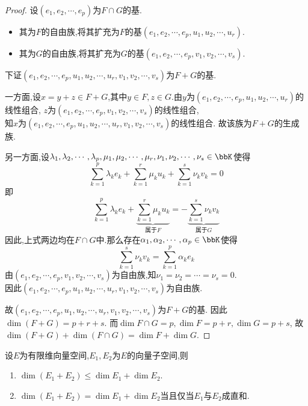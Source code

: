 \begin{proof}
    设$(e_1, e_2, \cdots, e_p)$为$F \cap G$的基.

    \begin{itemize}
        \item 其为$F$的自由族,将其扩充为$F$的基$(e_1, e_2, \cdots, e_p, u_1, u_2, \cdots, u_r)$.
        \item 其为$G$的自由族,将其扩充为$G$的基$(e_1, e_2, \cdots, e_p, v_1, v_2, \cdots, v_s)$.
    \end{itemize}

    下证$(e_1, e_2, \cdots, e_p, u_1, u_2, \cdots, u_r, v_1, v_2, \cdots, v_s)$为$F + G$的基.

    一方面,设$x = y + z \in F + G$,其中$y \in F, z \in G$.由$y$为$(e_1, e_2, \cdots, e_p, u_1, u_2, \cdots, u_r)$的线性组合,
    $z$为$(e_1, e_2, \cdots, e_p, v_1, v_2, \cdots, v_s)$的线性组合,\\
    知$x$为$(e_1, e_2, \cdots, e_p, u_1, u_2, \cdots, u_r, v_1, v_2, \cdots, v_s)$的线性组合.
    故该族为$F + G$的生成族.

    另一方面,设$\lambda_1, \lambda_2, \cdots, \lambda_p, \mu_1, \mu_2, \cdots, \mu_r, \nu_1, \nu_2, \cdots, \nu_s \in \bbK$使得
    \[ \sum\limits_{k = 1}^p \lambda_k e_k + \sum\limits_{k = 1}^r \mu_k u_k + \sum\limits_{k = 1}^s \nu_k v_k = 0 \]即
    $$\sum_{k = 1}^p \lambda_k e_k + \underbrace{\sum_{k = 1}^r \mu_k u_k}_{\text{属于} F} = 
    -\underbrace{\sum_{k = 1}^s \nu_k v_k}_{\text{属于} G}$$
    因此,上式两边均在$F \cap G$中.那么存在$\alpha_1, \alpha_2, \cdots, \alpha_p \in \bbK$使得
    \[ \sum\limits_{k = 1}^s \nu_k v_k = \sum\limits_{k = 1}^p \alpha_k e_k \]
    由$(e_1, e_2, \cdots, e_p, v_1, v_2, \cdots, v_s)$为自由族,知$\nu_1 = \nu_2 = \cdots = \nu_s = 0$.\\
    因此$(e_1, e_2, \cdots, e_p, u_1, u_2, \cdots, u_r, v_1, v_2, \cdots, v_s)$为自由族.

    故$(e_1, e_2, \cdots, e_p, u_1, u_2, \cdots, u_r, v_1, v_2, \cdots, v_s)$为$F + G$的基.
    因此$\dim (F + G) = p + r + s$.
    而$\dim F \cap G = p, \dim F = p + r, \dim G = p + s$,
    故$\dim (F + G) + \dim (F \cap G) = \dim F + \dim G$.
\end{proof}

\begin{cor}
    设$E$为有限维向量空间,$E_1, E_2$为$E$的向量子空间,则

    \begin{enumerate}
        \item $\dim (E_1 + E_2) \leqslant \dim E_1 + \dim E_2$.
        \item $\dim (E_1 + E_2) = \dim E_1 + \dim E_2$当且仅当$E_1$与$E_2$成直和.
    \end{enumerate}
\end{cor}

